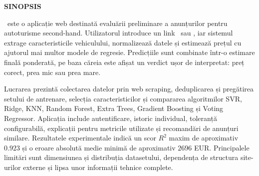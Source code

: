 
\thispagestyle{plain}
\vspace*{\fill}

\begin{center}
\begin{minipage}{0.86\textwidth}
    \begin{center}
        {\LARGE\bfseries SINOPSIS\par}
    \end{center}
    \vspace{5mm}

    \project\ este o aplicație web destinată evaluării preliminare a anunțurilor pentru autoturisme second-hand. Utilizatorul introduce un link \autovit\ sau \mobilede, iar sistemul extrage caracteristicile vehiculului, normalizează datele și estimează prețul cu ajutorul mai multor modele de regresie. Predicțiile sunt combinate într-o estimare finală ponderată, pe baza căreia este afișat un verdict ușor de interpretat: preț corect, prea mic sau prea mare.

    Lucrarea prezintă colectarea datelor prin web scraping, deduplicarea și pregătirea setului de antrenare, selecția caracteristicilor și compararea algoritmilor SVR, Ridge, KNN, Random Forest, Extra Trees, Gradient Boosting și Voting Regressor. Aplicația include autentificare, istoric individual, toleranță configurabilă, explicații pentru metricile utilizate și recomandări de anunțuri similare. Rezultatele experimentale indică un scor \(R^2\) maxim de aproximativ \(0.923\) și o eroare absolută medie minimă de aproximativ \(2696\) EUR. Principalele limitări sunt dimensiunea și distribuția datasetului, dependența de structura site-urilor externe și lipsa unor informații tehnice complete.
\end{minipage}
\end{center}

\vfill

